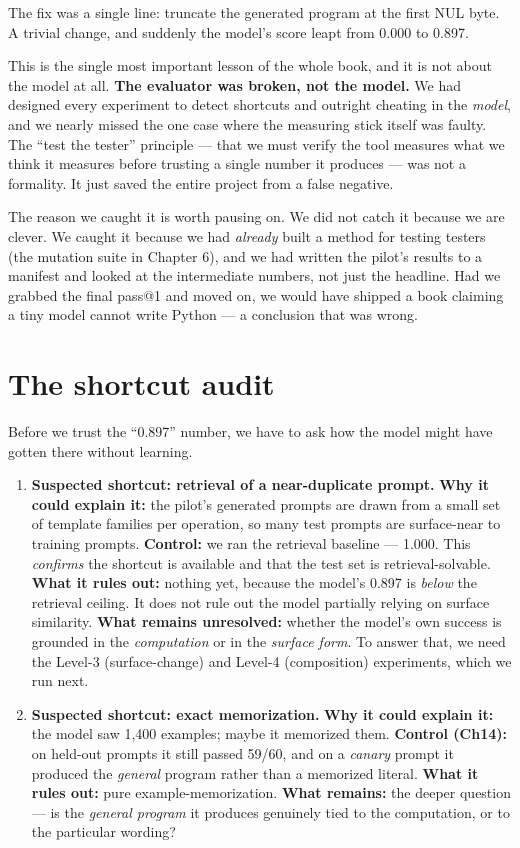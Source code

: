 The fix was a single line: truncate the generated program at the first
NUL byte. A trivial change, and suddenly the model's score leapt from
0.000 to 0.897.

This is the single most important lesson of the whole book, and it is
not about the model at all. \textbf{The evaluator was broken, not the
model.} We had designed every experiment to detect shortcuts and
outright cheating in the \emph{model}, and we nearly missed the one case
where the measuring stick itself was faulty. The ``test the tester''
principle --- that we must verify the tool measures what we think it
measures before trusting a single number it produces --- was not a
formality. It just saved the entire project from a false negative.

The reason we caught it is worth pausing on. We did not catch it because
we are clever. We caught it because we had \emph{already} built a method
for testing testers (the mutation suite in Chapter 6), and we had
written the pilot's results to a manifest and looked at the intermediate
numbers, not just the headline. Had we grabbed the final pass@1 and
moved on, we would have shipped a book claiming a tiny model cannot
write Python --- a conclusion that was wrong.

\section{The shortcut audit}\label{the-shortcut-audit}

Before we trust the ``0.897'' number, we have to ask how the model might
have gotten there without learning.

\begin{enumerate}
\def\labelenumi{\arabic{enumi}.}
\item
  \textbf{Suspected shortcut: retrieval of a near-duplicate prompt.}
  \textbf{Why it could explain it:} the pilot's generated prompts are
  drawn from a small set of template families per operation, so many
  test prompts are surface-near to training prompts. \textbf{Control:}
  we ran the retrieval baseline --- 1.000. This \emph{confirms} the
  shortcut is available and that the test set is retrieval-solvable.
  \textbf{What it rules out:} nothing yet, because the model's 0.897 is
  \emph{below} the retrieval ceiling. It does not rule out the model
  partially relying on surface similarity. \textbf{What remains
  unresolved:} whether the model's own success is grounded in the
  \emph{computation} or in the \emph{surface form}. To answer that, we
  need the Level-3 (surface-change) and Level-4 (composition)
  experiments, which we run next.
\item
  \textbf{Suspected shortcut: exact memorization.} \textbf{Why it could
  explain it:} the model saw 1,400 examples; maybe it memorized them.
  \textbf{Control (Ch14):} on held-out prompts it still passed 59/60,
  and on a \emph{canary} prompt it produced the \emph{general} program
  rather than a memorized literal. \textbf{What it rules out:} pure
  example-memorization. \textbf{What remains:} the deeper question ---
  is the \emph{general program} it produces genuinely tied to the
  computation, or to the particular wording?
\end{enumerate}

